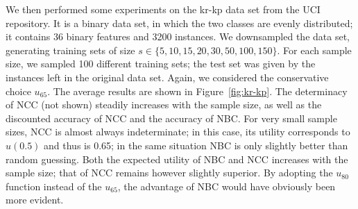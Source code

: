 \documentclass[a4paper,10pt,reqno]{amsart}
\theoremstyle{remark}
\begin{document}
We then performed some experiments on the kr-kp data set from the UCI repository.
It is a binary data set, in which the two classes are evenly distributed; it contains 36 binary features and 3200 instances. 
We downsampled the data set, generating training sets of size $s \in \{5, 10, 15, 20 ,30, 50, 100, 150\}$. For each sample size, we sampled 100 different training sets;  the test set was given by the instances left in the original data set. Again, we considered the conservative choice $u_{65}$.
The average results are shown in Figure~\ref{fig:kr-kp}. The determinacy of NCC (not shown) steadily increases with the sample size, as well as the discounted accuracy of NCC and the accuracy of NBC. For very small sample sizes, NCC is almost always indeterminate; in this case, its utility corresponds to $u(0.5)$ and thus is 0.65; in the same situation NBC is only slightly better than random guessing. Both the expected utility of NBC and NCC increases with the sample size; that of NCC remains however slightly superior. 
By adopting the $u_{80}$ function instead of the $u_{65}$, the advantage of NBC would have obviously been more evident.

% 
\end{document}
